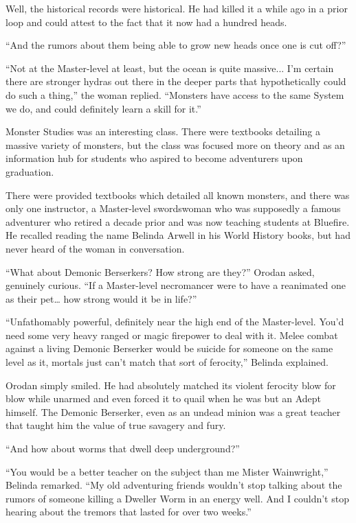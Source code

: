 \documentclass[a4paper,10pt]{book}
\begin{document}
Well, the historical records were historical. He had killed it a while ago in a prior loop and could attest to the fact that it now had a hundred heads.\par
“And the rumors about them being able to grow new heads once one is cut off?”\par
“Not at the Master-level at least, but the ocean is quite massive... I’m certain there are stronger hydras out there in the deeper parts that hypothetically could do such a thing,” the woman replied. “Monsters have access to the same System we do, and could definitely learn a skill for it.”\par
Monster Studies was an interesting class. There were textbooks detailing a massive variety of monsters, but the class was focused more on theory and as an information hub for students who aspired to become adventurers upon graduation.\par
There were provided textbooks which detailed all known monsters, and there was only one instructor, a Master-level swordswoman who was supposedly a famous adventurer who retired a decade prior and was now teaching students at Bluefire. He recalled reading the name Belinda Arwell in his World History books, but had never heard of the woman in conversation.\par
“What about Demonic Berserkers? How strong are they?” Orodan asked, genuinely curious. “If a Master-level necromancer were to have a reanimated one as their pet… how strong would it be in life?”\par
“Unfathomably powerful, definitely near the high end of the Master-level. You’d need some very heavy ranged or magic firepower to deal with it. Melee combat against a living Demonic Berserker would be suicide for someone on the same level as it, mortals just can’t match that sort of ferocity,” Belinda explained.\par
Orodan simply smiled. He had absolutely matched its violent ferocity blow for blow while unarmed and even forced it to quail when he was but an Adept himself. The Demonic Berserker, even as an undead minion was a great teacher that taught him the value of true savagery and fury.\par
“And how about worms that dwell deep underground?”\par
“You would be a better teacher on the subject than me Mister Wainwright,” Belinda remarked. “My old adventuring friends wouldn’t stop talking about the rumors of someone killing a Dweller Worm in an energy well. And I couldn’t stop hearing about the tremors that lasted for over two weeks.”\par
\end{document}
